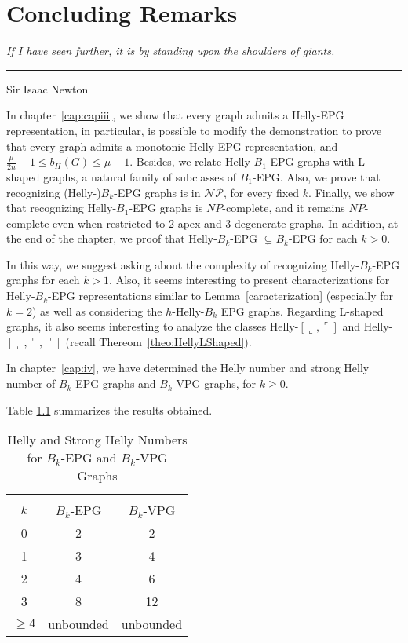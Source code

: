 \chapter{Concluding Remarks}\label{conclusao}

\begin{flushright}
\begin{minipage}[t][0cm][b]{0.47\textwidth}
\emph{
If I have seen further, it is by standing upon the shoulders of giants.}
\end{minipage}

\rule[0cm]{7cm}{0.03cm}%

Sir Isaac Newton
\end{flushright}


In chapter~\ref{cap:capiii}, we show that every graph admits a Helly-EPG representation, in particular, is possible to modify the demonstration to prove that every graph admits a monotonic Helly-EPG representation, and $\frac{\mu}{2n}-1\leq b_H(G)\leq \mu -1$. Besides, we relate Helly-$B_1$-EPG graphs with L-shaped graphs, a natural family of subclasses of $B_1$-EPG. Also, we prove that recognizing (Helly-)$B_k$-EPG graphs is in $\mathcal{NP}$, for every fixed $k$. Finally, we show that recognizing Helly-$B_1$-EPG graphs is $NP$-complete, and it remains $NP$-complete even when restricted to 2-apex and 3-degenerate graphs. In addition, at the end of the chapter, we proof that
Helly-$B_k$-EPG $\subsetneq B_k$-EPG for each $k>0$.

In this way, we suggest asking about the complexity of recognizing Helly-$B_k$-EPG graphs for each $k>1$. Also, it seems interesting to present characterizations for Helly-$B_k$-EPG representations similar to Lemma~\ref{caracterization} (especially for $k=2$) as well as considering the $h$-Helly-$B_k$ EPG graphs. Regarding L-shaped graphs, it also seems interesting to analyze the classes Helly-$[\llcorner, \ulcorner]$ and Helly-$[\llcorner, \ulcorner, \urcorner]$ (recall Thereom~\ref{theo:HellyLShaped}).

In chapter~\ref{cap:iv}, we have determined the Helly number and strong Helly number of $B_k$-EPG graphs and $B_k$-VPG graphs, for $k \geq 0$. 

Table \ref{tab:Helly-Strong-Helly2} summarizes the results obtained.
 
\Large 

\begin{table}[htb]
    \centering
    \caption{Helly and Strong Helly Numbers for $B_k$-EPG and $B_k$-VPG Graphs}
    \label{tab:Helly-Strong-Helly2}
    \begin{tabular}{c|c|c}
     \multicolumn{3}{c}{}\\
    \cline{1-3} $k$  & $B_k$-EPG & $B_k$-VPG \\
    \cline{1-3} 0 & 2 & 2 \\
    \cline{1-3} 1 & 3 & 4 \\
    \cline{1-3} 2 & 4 & 6 \\
    \cline{1-3} 3 & 8 & 12 \\
    \cline{1-3} $\geq 4$ & unbounded & unbounded \\
    \cline{1-3} 
    \end{tabular}
\end{table}

